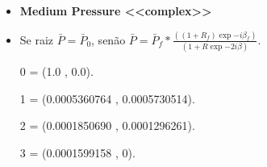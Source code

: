 \documentclass[10pt,aspectratio=169]{beamer}
\theoremstyle{remark}
\theoremstyle{definition}
\begin{document}
\begin{frame}[allowframebreaks]
\begin{itemize}
	\end{itemize}
		
		\framebreak

	\begin{itemize}
		\item \textbf{Medium Pressure <<complex>>}
		\item Se raiz $ \bar{P} = \bar{P}_0 $, senão $ \bar{P} = \bar{P}_f * \frac{((1 + R_f)\exp{-i\beta_f})}{(1 + R\exp{-2i\beta})}$.
		\item [0] = (1.0  ,  0.0).
		\item [1] = (0.0005360764  ,  0.0005730514).
		\item [2] = (0.0001850690  ,  0.0001296261).
		\item [3] = (0.0001599158  ,  0).
	
	\end{itemize}
		
\end{frame}
	
	
	
\end{document}
